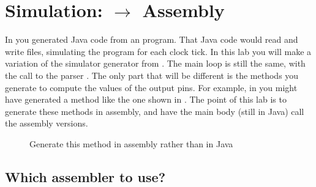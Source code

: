 \chapter{Simulation: \F $\rightarrow$ Assembly}



In  you generated Java code from an \F program. That
Java code would read and write \W files, simulating the \F program for
each clock tick.
%
In this lab you will make a variation of the simulator generator from
. The main loop is still the same, with the call to
the \W parser \etc. The only part that will be different is the methods
you generate to compute the values of the output pins. For example, in
 you might have generated a method like the one shown
in .
%
The point of this lab is to generate these methods in assembly, and have
the main body (still in Java) call the assembly versions.


\begin{figure}
\label{fig:Simulator_ex11b.java}
\caption{Generate this method in assembly rather than in Java}
%
%

\end{figure}




\section{Which assembler to use?}

